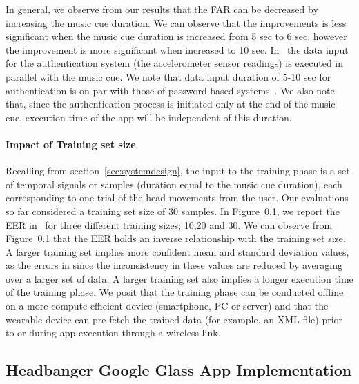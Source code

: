 In general, we observe from our results that the FAR can 
be decreased by increasing the music cue duration. 
We can observe that the improvements is less significant when the music cue
duration is increased from 5 sec to 6 sec, however the improvement is more 
significant when increased to 10 sec. 
In \systemname~the data input for the authentication system (the accelerometer 
sensor readings) is executed in parallel with the music cue.
We note that data input duration of 5-10 sec for authentication 
is on par with those of password based systems~\cite{}.
We also note that, since the authentication process is initiated only at the 
end of the music cue, execution time of the app will be independent
of this duration.

\paragraph{Impact of Training set size}
Recalling from section~\ref{sec:systemdesign}, the input to the training phase
is a set of temporal signals or samples (duration equal to the music cue 
duration), each corresponding to one trial of the head-movements from the 
user. Our evaluations so far considered a training set size of 30 samples. 
In Figure~\ref{}, we report the EER in \systemname~for three different 
training sizes; 10,20 and 30.
We can observe from Figure~\ref{} that the EER holds an inverse relationship 
with the training set size. A larger training set implies more confident mean 
and standard deviation values, as the errors in since the inconsistency in 
these values are reduced by averaging over a larger set of data.
A larger training set also implies a longer execution time of the training 
phase. We posit that the training phase can be conducted offline on a more
compute efficient device (smartphone, PC or server) and that the wearable
device can pre-fetch the trained data (for example, an XML file) prior to or 
during app execution through a wireless link.


\subsection{Headbanger Google Glass App Implementation}

